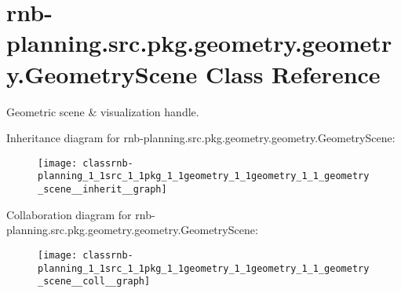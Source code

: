 \hypertarget{classrnb-planning_1_1src_1_1pkg_1_1geometry_1_1geometry_1_1_geometry_scene}{}\section{rnb-\/planning.src.\+pkg.\+geometry.\+geometry.\+Geometry\+Scene Class Reference}
\label{classrnb-planning_1_1src_1_1pkg_1_1geometry_1_1geometry_1_1_geometry_scene}


Geometric scene \& visualization handle.  




Inheritance diagram for rnb-\/planning.src.\+pkg.\+geometry.\+geometry.\+Geometry\+Scene\+:
\nopagebreak
\begin{figure}[H]
\begin{center}
\leavevmode
\texttt{[image: classrnb-planning\_1\_1src\_1\_1pkg\_1\_1geometry\_1\_1geometry\_1\_1\_geometry\_scene\_\_inherit\_\_graph]}
\end{center}
\end{figure}


Collaboration diagram for rnb-\/planning.src.\+pkg.\+geometry.\+geometry.\+Geometry\+Scene\+:
\nopagebreak
\begin{figure}[H]
\begin{center}
\leavevmode
\texttt{[image: classrnb-planning\_1\_1src\_1\_1pkg\_1\_1geometry\_1\_1geometry\_1\_1\_geometry\_scene\_\_coll\_\_graph]}
\end{center}
\end{figure}

